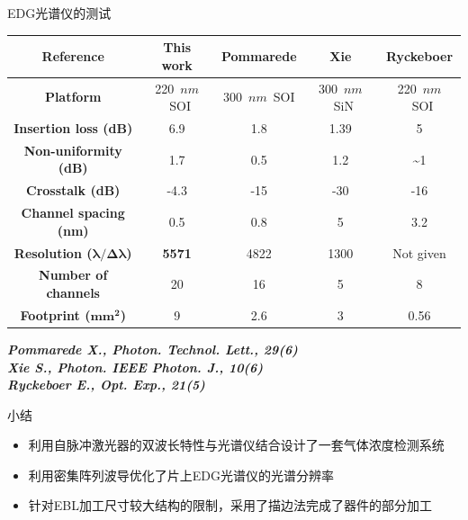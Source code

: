 \documentclass{beamer}
\begin{document}
\begin{frame}{\mbox{EDG}光谱仪的测试}
\begin{table}[h]
	\centering
	\begin{tabular}[t]{|c|c|c|c|c|}
		\hline
		\textbf{Reference} & This work & Pommarede & Xie & Ryckeboer \\
		\hline
		\textbf{Platform} & 220~$nm$~SOI & 300~$nm$~SOI & 300~$nm$~SiN & 220~$nm$~SOI\\
		\hline
		\textbf{Insertion loss (dB)} & 6.9 & 1.8 & 1.39 & 5\\
		\hline
		\textbf{Non-uniformity (dB)} & 1.7 & 0.5 & 1.2 & \~{}1\\
		\hline
		\textbf{Crosstalk (dB)} & -4.3 & -15 & -30 & -16\\
		\hline
		\textbf{Channel spacing (nm)} & 0.5 & 0.8 & 5 & 3.2\\
		\hline
		\textbf{Resolution ($\pmb{\lambda/\Delta\lambda}$)} & \textbf{{\color{red}5571}} & 4822 & 1300 & Not given \\
		\hline
		\textbf{Number of channels} & 20 & 16 & 5 & 8 \\
		\hline
		\textbf{Footprint ($\pmb{mm^{2}}$)} & 9 & 2.6 & 3 & 0.56\\
		\hline
	\end{tabular}
\end{table}
\vspace{1cm}
\flushright\tiny\bfseries\emph
{Pommarede X., Photon. Technol. Lett., 29(6)\\Xie S., Photon. IEEE Photon. J., 10(6)\\Ryckeboer E., Opt. Exp., 21(5)}
\end{frame}

\begin{frame}{小结}
\begin{itemize}
	\item 利用自脉冲激光器的双波长特性与光谱仪结合设计了一套气体浓度检测系统
	\item 利用密集阵列波导优化了片上\mbox{EDG}光谱仪的光谱分辨率
	\item 针对\mbox{EBL}加工尺寸较大结构的限制，采用了描边法完成了器件的部分加工
\end{itemize}
\end{frame}
\end{document}
